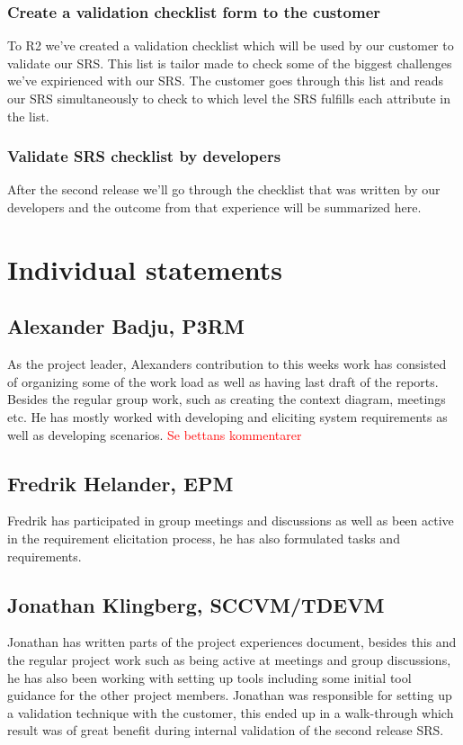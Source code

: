\documentclass[10pt]{article}
\newcommand\todo[1]{\textcolor{red}{#1}}
\begin{document}
\subsubsection{Create a validation checklist form to the customer}
To R2 we've created a validation checklist which will be used by our customer to validate our SRS. This list is tailor made to check some of the biggest challenges we've expirienced with our SRS. The customer goes through this list and reads our SRS simultaneously to check to which level the SRS fulfills each attribute in the list.

\subsubsection{Validate SRS checklist by developers}
After the second release we'll go through the checklist that was written by our developers and the outcome from that experience will be summarized here.

\section{Individual statements}
\noindent
\subsection{Alexander Badju, P3RM}
As the project leader, Alexanders contribution to this weeks work has consisted of organizing some of the work load as well as having last draft of the reports. Besides the regular group work, such as creating the context diagram, meetings etc. He has mostly worked with developing and eliciting system requirements as well as developing scenarios. 
\todo{Se bettans kommentarer}
\subsection{Fredrik Helander, EPM}
Fredrik has participated in group meetings and discussions as well as been active in the requirement elicitation process, he has also formulated tasks and requirements.  
\subsection{Jonathan Klingberg, SCCVM/TDEVM}
Jonathan has written parts of the project experiences document, besides this and the regular project work such as being active at meetings and group discussions, he has also been working with setting up tools including some initial tool guidance for the other project members.
Jonathan was responsible for setting up a validation technique with the customer, this ended up in a walk-through which result was of great benefit during internal validation of the second release SRS.
\end{document}
